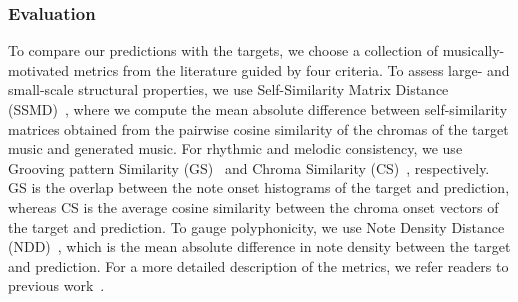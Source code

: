 \subsubsection{Evaluation}
To compare our predictions with the targets, we choose a collection of musically-motivated metrics from the literature guided by four criteria. To assess large- and small-scale structural properties, we use Self-Similarity Matrix Distance (SSMD)~\cite{wu_musemorphose_2021}, where we compute the mean absolute difference between self-similarity matrices obtained from the pairwise cosine similarity of the chromas of the target music and generated music. For rhythmic and melodic consistency, we use Grooving pattern Similarity (GS)~\cite{wu_jazz_2020} and Chroma Similarity (CS)~\cite{wu_musemorphose_2021}, respectively. GS is the overlap between the note onset histograms of the target and prediction, whereas CS is the average cosine similarity between the chroma onset vectors of the target and prediction. To gauge polyphonicity, we use Note Density Distance (NDD)~\cite{agarwal_structure_2024, haki_real_2022}, which is the mean absolute difference in note density between the target and prediction. For a more detailed description of the metrics, we refer readers to previous work~\cite{agarwal_structure_2024}.
